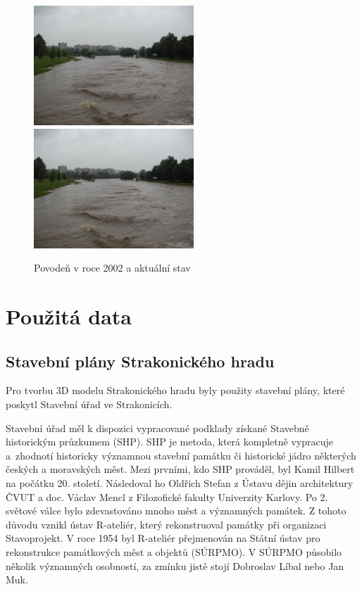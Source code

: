\documentclass[thesis=M,czech]{FITthesis}[2012/06/26]
\begin{document}
\begin{figure}[h!]
\centering
\includegraphics[width=6cm]{pics/povoden4.jpg}
\includegraphics[width=6cm]{pics/povoden4.jpg}
\caption{Povodeň v roce 2002 a aktuální stav}
\label{obr:povoden_hrad}
\end{figure}

\chapter{Použitá data}
\section{Stavební plány Strakonického hradu}
Pro tvorbu 3D modelu Strakonického hradu byly použity stavební plány, které poskytl Stavební úřad ve Strakonicích. 

Stavební úřad měl k dispozici vypracované podklady získané Stavebně historickým průzkumem (SHP). SHP je metoda, která kompletně vypracuje a~zhodnotí historicky významnou stavební památku či historické jádro některých českých a moravských měst. Mezi prvními, kdo SHP prováděl, byl Kamil Hilbert na počátku 20. století. Následoval ho Oldřich Stefan z Ústavu dějin architektury ČVUT a doc. Václav Mencl z Filozofické fakulty Univerzity Karlovy. Po 2. světové válce bylo zdevastováno mnoho měst a významných památek. Z tohoto důvodu vznikl ústav R-ateliér, který rekonstruoval památky při organizaci Stavoprojekt. V roce 1954 byl R-ateliér přejmenován na Státní ústav pro rekonstrukce památkových měst a objektů (SÚRPMO). V SÚRPMO působilo několik významných osobností, za zmínku jistě stojí Dobroslav Líbal nebo Jan Muk. 
\end{document}
